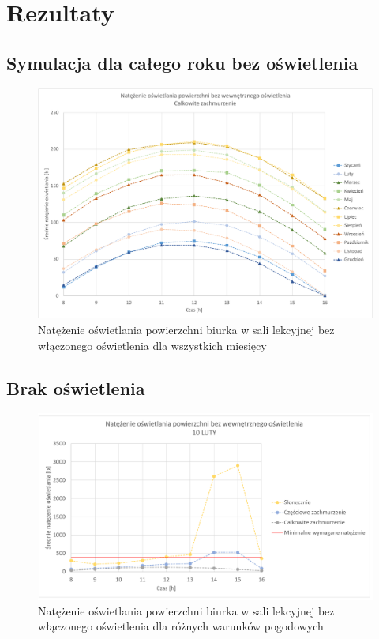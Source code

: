 \documentclass[a4paper,12pt]{article}
\begin{document}
	\section{Rezultaty}
	\label{sec:rezultaty}
	
	\subsection{Symulacja dla całego roku bez oświetlenia}
	\label{subsec:caly_rok}
	
	\begin{figure}[ht!]
		\includegraphics[scale=0.8]{Wykresy/caly_rok.pdf}
		\centering
		\caption{Natężenie oświetlania powierzchni biurka w sali lekcyjnej bez włączonego oświetlenia dla wszystkich miesięcy}
		\label{fig:caly_rok}
	\end{figure}
	
	\subsection{Brak oświetlenia}
	\label{subsec:brak_oswietlenia}
	
	\begin{figure}[ht!]
		\centering
		\includegraphics[scale=0.8]{Wykresy/bez_oswietlenia_1.pdf}
		\caption{Natężenie oświetlania powierzchni biurka w sali lekcyjnej bez włączonego oświetlenia dla różnych warunków pogodowych }
		\label{bez_oswietlenia_1}
	\end{figure}
\end{document}
